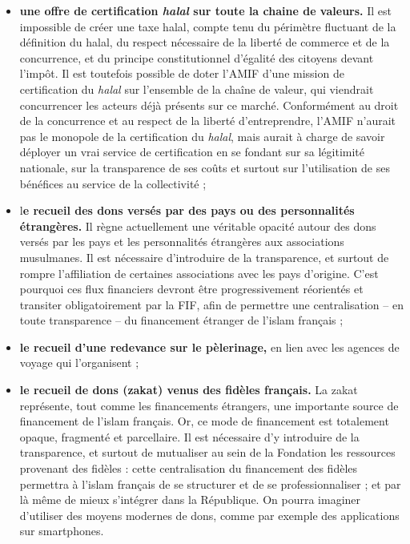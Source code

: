 \begin{itemize}
\item
  \textbf{une offre de certification \emph{halal} sur toute la chaine de
  valeurs.} Il est impossible de créer une taxe halal, compte tenu du
  périmètre fluctuant de la définition du halal, du respect nécessaire
  de la liberté de commerce et de la concurrence, et du principe
  constitutionnel d'égalité des citoyens devant l'impôt. Il est
  toutefois possible de doter l'AMIF d'une mission de certification du
  \emph{halal} sur l'ensemble de la chaîne de valeur, qui viendrait
  concurrencer les acteurs déjà présents sur ce marché. Conformément au
  droit de la concurrence et au respect de la liberté d'entreprendre,
  l'AMIF n'aurait pas le monopole de la certification du \emph{halal},
  mais aurait à charge de savoir déployer un vrai service de
  certification en se fondant sur sa légitimité nationale, sur la
  transparence de ses coûts et surtout sur l'utilisation de ses
  bénéfices au service de la collectivité ;
\item
  l\textbf{e recueil des dons versés par des pays ou des personnalités
  étrangères.} Il règne actuellement une véritable opacité autour des
  dons versés par les pays et les personnalités étrangères aux
  associations musulmanes. Il est nécessaire d'introduire de la
  transparence, et surtout de rompre l'affiliation de certaines
  associations avec les pays d'origine. C'est pourquoi ces flux
  financiers devront être progressivement réorientés et transiter
  obligatoirement par la FIF, afin de permettre une centralisation -- en
  toute transparence -- du financement étranger de l'islam français ;
\item
  \textbf{le recueil d'une redevance sur le pèlerinage,} en lien avec
  les agences de voyage qui l'organisent ;
\end{itemize}

\begin{quote}

\end{quote}

\begin{itemize}
\item
  \textbf{le recueil de dons (zakat) venus des fidèles français.} La
  zakat représente, tout comme les financements étrangers, une
  importante source de financement de l'islam français. Or, ce mode de
  financement est totalement opaque, fragmenté et parcellaire. Il est
  nécessaire d'y introduire de la transparence, et surtout de mutualiser
  au sein de la Fondation les ressources provenant des fidèles : cette
  centralisation du financement des fidèles permettra à l'islam français
  de se structurer et de se professionnaliser ; et par là même de mieux
  s'intégrer dans la République. On pourra imaginer d'utiliser des
  moyens modernes de dons, comme par exemple des applications sur
  smartphones.
\end{itemize}

